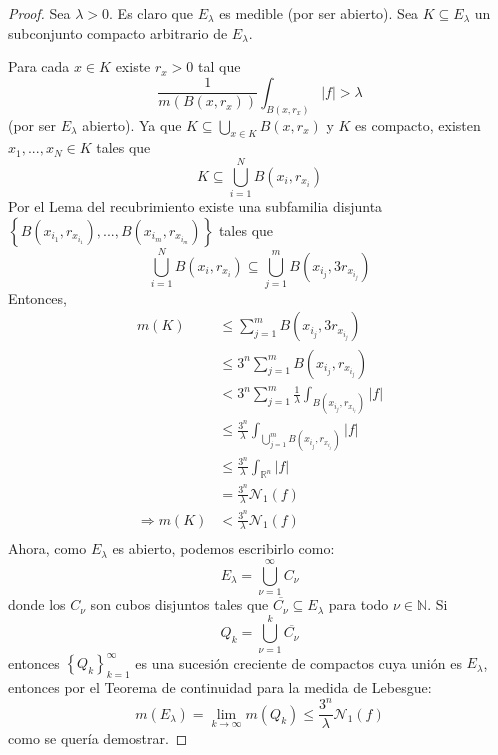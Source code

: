 \documentclass[12pt]{report}
\theoremstyle{largebreak}
\renewcommand{\leq}{\ensuremath{\leqslant}}
\newcommand\abs[1]{\ensuremath{\left|#1\right|}}
\newcommand{\N}[2]{\ensuremath{\mathcal{N}_{#1}\left(#2\right)}}
\begin{document}
    \begin{proof}
        Sea $\lambda>0$. Es claro que $E_\lambda$ es medible (por ser abierto). Sea $K\subseteq E_\lambda$ un subconjunto compacto arbitrario de $E_\lambda$.

        Para cada $x\in K$ existe $r_x>0$ tal que
        \begin{equation*}
            \frac{1}{m(B(x,r_x))}\int_{B(x,r_x)}\abs{f}>\lambda
        \end{equation*}
        (por ser $E_\lambda$ abierto). Ya que $K\subseteq \bigcup_{ x\in K}B(x,r_x)$ y $K$ es compacto, existen $x_1,...,x_N\in K$ tales que
        \begin{equation*}
            K\subseteq \bigcup_{ i=1}^N B(x_i,r_{ x_i})
        \end{equation*}
        Por el Lema del recubrimiento existe una subfamilia disjunta $\left\{B(x_{ i_1},r_{ x_{i_1}}),...,B(x_{ i_m},r_{ x_{i_m}})\right\}$ tales que
        \begin{equation*}
            \bigcup_{ i=1}^N B(x_i,r_{ x_i})\subseteq\bigcup_{ j=1}^{ m}B(x_{ i_j},3r_{x_{ i_j}} )
        \end{equation*}
        Entonces,
        \begin{equation*}
            \begin{split}
                m(K)&\leq\sum_{ j=1}^m B(x_{ i_j},3r_{x_{ i_j}})\\
                &\leq3^n\sum_{ j=1}^m B(x_{ i_j},r_{x_{ i_j}})\\
                &<3^n\sum_{ j=1}^m \frac{1}{\lambda}\int_{ B(x_{ i_j},r_{x_{ i_j}})}\abs{f}\\
                &\leq\frac{3^n}{\lambda}\int_{\bigcup_{ j=1}^{ m}B(x_{ i_j},r_{x_{ i_j}})}\abs{f}\\
                &\leq\frac{3^n}{\lambda}\int_{\mathbb{R}^n}\abs{f}\\
                &=\frac{3^n}{\lambda}\N{1}{f}\\
                \Rightarrow m(K)&<\frac{3^n}{\lambda}\N{1}{f}\\
            \end{split}
        \end{equation*}
        Ahora, como $E_\lambda$ es abierto, podemos escribirlo como:
        \begin{equation*}
            E_\lambda=\bigcup_{ \nu=1}^\infty C_{\nu}
        \end{equation*}
        donde los $C_\nu$ son cubos disjuntos tales que $\overline{C_\nu}\subseteq E_\lambda$ para todo $\nu\in\mathbb{N}$. Si
        \begin{equation*}
            Q_k=\bigcup_{ \nu=1}^k\overline{C_\nu}
        \end{equation*}
        entonces $\left\{Q_k \right\}_{ k=1}^\infty$ es una sucesión creciente de compactos cuya unión es $E_\lambda$, entonces por el Teorema de continuidad para la medida de Lebesgue:
        \begin{equation*}
            m(E_\lambda)=\lim_{ k\rightarrow\infty}m(Q_k)\leq\frac{3^n}{\lambda}\N{1}{f}
        \end{equation*}
        como se quería demostrar.
    \end{proof}
\end{document}
